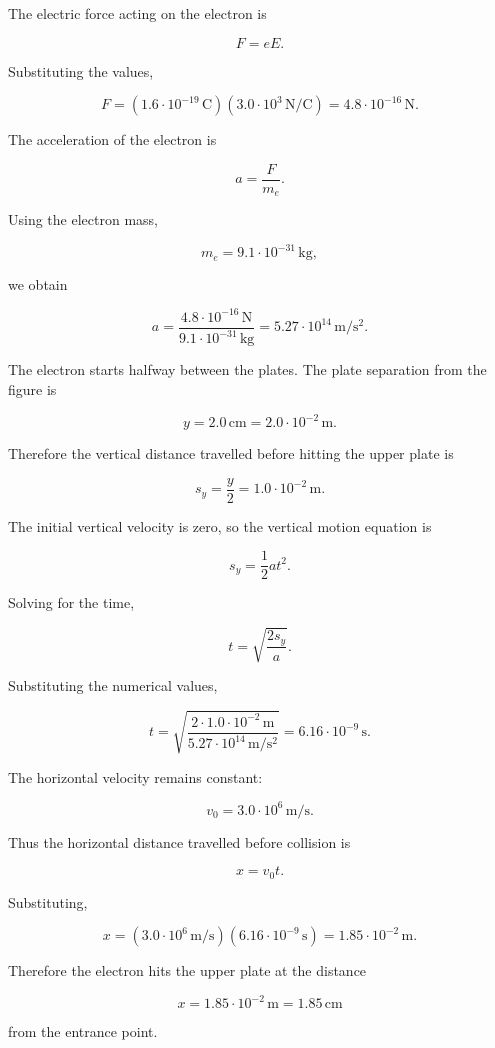 \documentclass[letterpaper,12pt]{letter}
\begin{document}
\begin{enumerate}[label=\Roman*.]
\begin{enumerate}[label=\arabic*.]
The electric force acting on the electron is

$$F=eE.$$

Substituting the values,

$$F=(1.6\cdot10^{-19}\,\mathrm{C})(3.0\cdot10^3\,\mathrm{N/C})=4.8\cdot10^{-16}\,\mathrm{N}.$$

The acceleration of the electron is

$$a=\frac{F}{m_e}.$$

Using the electron mass,

$$m_e=9.1\cdot10^{-31}\,\mathrm{kg},$$

we obtain

$$a=\frac{4.8\cdot10^{-16}\,\mathrm{N}}{9.1\cdot10^{-31}\,\mathrm{kg}}=5.27\cdot10^{14}\,\mathrm{m/s^2}.$$

The electron starts halfway between the plates. The plate separation from the figure is

$$y=2.0\,\mathrm{cm}=2.0\cdot10^{-2}\,\mathrm{m}.$$

Therefore the vertical distance travelled before hitting the upper plate is

$$s_y=\frac{y}{2}=1.0\cdot10^{-2}\,\mathrm{m}.$$

The initial vertical velocity is zero, so the vertical motion equation is

$$s_y=\frac{1}{2}at^2.$$

Solving for the time,

$$t=\sqrt{\frac{2s_y}{a}}.$$

Substituting the numerical values,

$$t=\sqrt{\frac{2\cdot1.0\cdot10^{-2}\,\mathrm{m}}{5.27\cdot10^{14}\,\mathrm{m/s^2}}}=6.16\cdot10^{-9}\,\mathrm{s}.$$

The horizontal velocity remains constant:

$$v_0=3.0\cdot10^6\,\mathrm{m/s}.$$

Thus the horizontal distance travelled before collision is

$$x=v_0t.$$

Substituting,

$$x=(3.0\cdot10^6\,\mathrm{m/s})(6.16\cdot10^{-9}\,\mathrm{s})=1.85\cdot10^{-2}\,\mathrm{m}.$$

Therefore the electron hits the upper plate at the distance

$$\boxed{x=1.85\cdot10^{-2}\,\mathrm{m}=1.85\,\mathrm{cm}}$$

from the entrance point.



\end{enumerate}
\end{enumerate}
\end{document}
